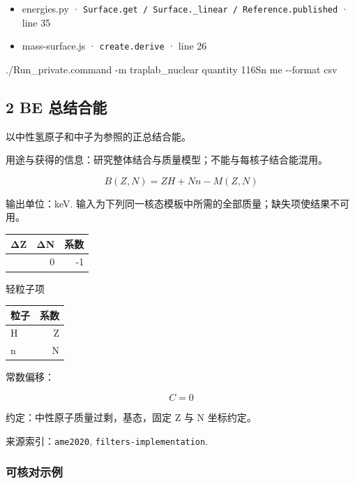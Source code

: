\documentclass[
  11pt,
  letterpaper,
]{article}
\newenvironment{Shaded}{}{}
\newcommand{\AttributeTok}[1]{\textcolor[rgb]{0.49,0.56,0.16}{#1}}
\newcommand{\ExtensionTok}[1]{#1}
\newcommand{\NormalTok}[1]{#1}
\providecommand{\tightlist}{%
  \setlength{\itemsep}{0pt}\setlength{\parskip}{0pt}}
\begin{document}
\begin{itemize}
\tightlist
\item
  energies.py ·
  \texttt{Surface.get\ /\ Surface.\_linear\ /\ Reference.published} ·
  line 35
\item
  mass-surface.js · \texttt{create.derive} · line 26
\end{itemize}

\begin{Shaded}
\begin{Highlighting}[]
\ExtensionTok{./Run\_private.command} \AttributeTok{{-}m}\NormalTok{ traplab\_nuclear quantity 116Sn me }\AttributeTok{{-}{-}format}\NormalTok{ csv}
\end{Highlighting}
\end{Shaded}

\subsection{2 BE 总结合能}\label{be-ux603bux7ed3ux5408ux80fd}

以中性氢原子和中子为参照的正总结合能。

用途与获得的信息：研究整体结合与质量模型；不能与每核子结合能混用。

\[
B(Z,N)=Z H+N n-M(Z,N)
\]

输出单位：keV.
输入为下列同一核态模板中所需的全部质量；缺失项使结果不可用。

\begin{longtable}[]{@{}rrr@{}}
\toprule\noalign{}
ΔZ & ΔN & 系数 \\
\midrule\noalign{}
\endhead
\bottomrule\noalign{}
\endlastfoot
0 & 0 & -1 \\
\end{longtable}

轻粒子项

\begin{longtable}[]{@{}lr@{}}
\toprule\noalign{}
粒子 & 系数 \\
\midrule\noalign{}
\endhead
\bottomrule\noalign{}
\endlastfoot
H & Z \\
n & N \\
\end{longtable}

常数偏移：

\[
C=0
\]

约定：中性原子质量过剩，基态，固定 Z 与 N 坐标约定。

来源索引：\texttt{ame2020}, \texttt{filters-implementation}.

\subsubsection{可核对示例}\label{ux53efux6838ux5bf9ux793aux4f8b-1}
\end{document}
